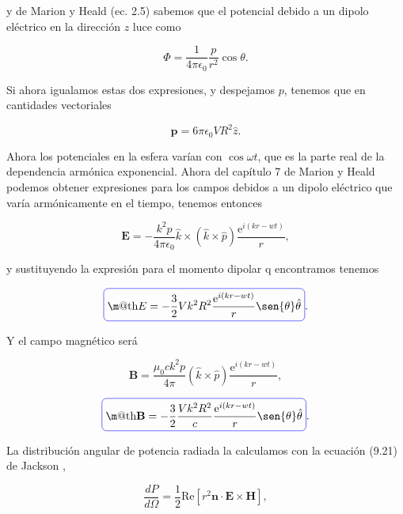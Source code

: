 \documentclass[a4paper,11pt]{article}
\makeatletter
\numberwithin{equation}{section}
\newcommand*{\boxcolor}{blue}
\renewcommand{\boxed}[1]{\textcolor{\boxcolor}{%
\tikz[baseline={([yshift=-1ex]current bounding box.center)}] \node [rectangle, minimum width=1ex,rounded corners,draw] {\normalcolor\m@th$\displaystyle#1$};}}
\newcommand{\euler}{\mathrm{e}}
\makeatother
\begin{document}
y de Marion y Heald (ec. 2.5) \cite{marion} sabemos que el potencial debido a 
un dipolo eléctrico en la dirección $z$ luce como 

\begin{equation}
 \Phi = \frac{1}{4\pi\epsilon_0}\frac{p}{r^2}\cos{\theta}.
\end{equation}

Si ahora igualamos estas dos expresiones, y despejamos $p$, tenemos que en 
cantidades vectoriales 

\begin{equation}
 \mathbf{p} = 6\pi \epsilon_0 V R^2 \hat{z}.
\end{equation}

Ahora los potenciales en la esfera varían con $\cos{\omega t}$, que es la parte 
real de la dependencia armónica exponencial. Ahora del capítulo 7 de Marion y 
Heald \cite{marion} podemos obtener expresiones para los campos debidos 
a un dipolo eléctrico que varía armónicamente en el tiempo, tenemos entonces 

\begin{equation}
 \mathbf{E} = - \frac{k^2p}{4\pi\epsilon_0} \hat{k} \times (\hat{k} \times \hat{p}) 
 \frac{\euler^{i(kr - wt)}}{r},
\end{equation}

y sustituyendo la expresión para el momento dipolar q encontramos tenemos 

\begin{equation}
 \boxed{E = - \frac{3}{2} V k^2 R^2  \frac{\euler^{i(kr - wt)}}{r} \sen{\theta}
 \hat{\theta}}.
\end{equation}

Y el campo magnético será 

\begin{equation}
 \mathbf{B} = \frac{\mu_0 c k^2 p}{4\pi} (\hat{k} \times \hat{p}) 
 \frac{\euler^{i(kr - wt)}}{r},
\end{equation}

\begin{equation}
 \boxed{\mathbf{B} = - \frac{3}{2} \frac{V k^2 R^2}{c} \frac{\euler^{i(kr - wt)}}{r}
 \sen{\theta} \hat{\theta}}.
\end{equation}

La distribución angular de potencia radiada la calculamos con la ecuación 
(9.21) de Jackson \cite{jackson},

\begin{equation}
 \frac{dP}{d\Omega} = \frac{1}{2}\text{Re}[r^2\mathbf{n} \cdot \mathbf{E} \times 
 \mathbf{H}], 
\end{equation}
\end{document}
